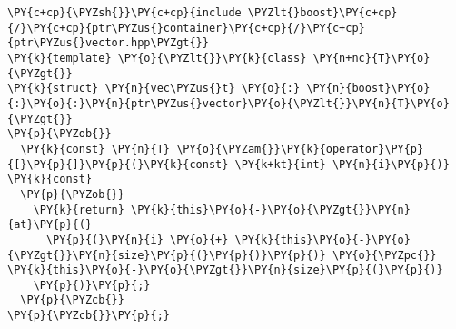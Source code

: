 \begin{Verbatim}[commandchars=\\\{\}]
\PY{c+cp}{\PYZsh{}}\PY{c+cp}{include \PYZlt{}boost}\PY{c+cp}{/}\PY{c+cp}{ptr\PYZus{}container}\PY{c+cp}{/}\PY{c+cp}{ptr\PYZus{}vector.hpp\PYZgt{}}
\PY{k}{template} \PY{o}{\PYZlt{}}\PY{k}{class} \PY{n+nc}{T}\PY{o}{\PYZgt{}}
\PY{k}{struct} \PY{n}{vec\PYZus{}t} \PY{o}{:} \PY{n}{boost}\PY{o}{:}\PY{o}{:}\PY{n}{ptr\PYZus{}vector}\PY{o}{\PYZlt{}}\PY{n}{T}\PY{o}{\PYZgt{}}
\PY{p}{\PYZob{}}
  \PY{k}{const} \PY{n}{T} \PY{o}{\PYZam{}}\PY{k}{operator}\PY{p}{[}\PY{p}{]}\PY{p}{(}\PY{k}{const} \PY{k+kt}{int} \PY{n}{i}\PY{p}{)} \PY{k}{const}
  \PY{p}{\PYZob{}}   
    \PY{k}{return} \PY{k}{this}\PY{o}{-}\PY{o}{\PYZgt{}}\PY{n}{at}\PY{p}{(}
      \PY{p}{(}\PY{n}{i} \PY{o}{+} \PY{k}{this}\PY{o}{-}\PY{o}{\PYZgt{}}\PY{n}{size}\PY{p}{(}\PY{p}{)}\PY{p}{)} \PY{o}{\PYZpc{}} \PY{k}{this}\PY{o}{-}\PY{o}{\PYZgt{}}\PY{n}{size}\PY{p}{(}\PY{p}{)}
    \PY{p}{)}\PY{p}{;} 
  \PY{p}{\PYZcb{}}
\PY{p}{\PYZcb{}}\PY{p}{;}
\end{Verbatim}
